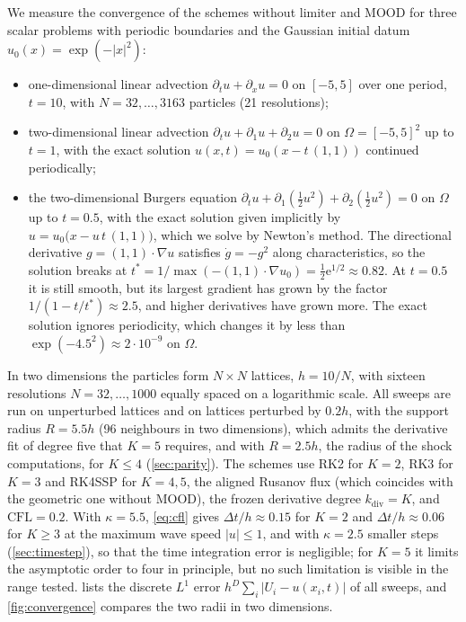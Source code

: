 \documentclass[11pt,a4paper]{article}
\numberwithin{equation}{section}
\newcommand{\CFL}{\mathrm{CFL}}
\begin{document}
We measure the convergence of the schemes without limiter and MOOD for three scalar problems with periodic boundaries and the Gaussian initial datum $u_0(x)=\exp(-|x|^2)$:
\begin{itemize}
\item one-dimensional linear advection $\partial_tu+\partial_xu=0$ on $[-5,5]$ over one period, $t=10$, with $N=32,\dots,3163$ particles (21 resolutions);
\item two-dimensional linear advection $\partial_tu+\partial_1u+\partial_2u=0$ on $\Omega=[-5,5]^2$ up to $t=1$, with the exact solution $u(x,t)=u_0(x-t\,(1,1))$ continued periodically;
\item the two-dimensional Burgers equation $\partial_tu+\partial_1(\tfrac12u^2)+\partial_2(\tfrac12u^2)=0$ on $\Omega$ up to $t=0.5$, with the exact solution given implicitly by $u=u_0\big(x-u\,t\,(1,1)\big)$, which we solve by Newton's method. The directional derivative $g=(1,1)\cdot\nabla u$ satisfies $\dot g=-g^2$ along characteristics, so the solution breaks at $t^*=1/\max(-(1,1)\cdot\nabla u_0)=\tfrac12\mathrm{e}^{1/2}\approx0.82$. At $t=0.5$ it is still smooth, but its largest gradient has grown by the factor $1/(1-t/t^*)\approx2.5$, and higher derivatives have grown more. The exact solution ignores periodicity, which changes it by less than $\exp(-4.5^2)\approx2\cdot10^{-9}$ on $\Omega$.
\end{itemize}
In two dimensions the particles form $N\times N$ lattices, $h=10/N$, with sixteen resolutions $N=32,\dots,1000$ equally spaced on a logarithmic scale. All sweeps are run on unperturbed lattices and on lattices perturbed by $0.2h$, with the support radius $R=5.5h$ (96 neighbours in two dimensions), which admits the derivative fit of degree five that $K=5$ requires, and with $R=2.5h$, the radius of the shock computations, for $K\le4$ (\cref{sec:parity}). The schemes use RK2 for $K=2$, RK3 for $K=3$ and RK4SSP for $K=4,5$, the aligned Rusanov flux (which coincides with the geometric one without MOOD), the frozen derivative degree $k_{\mathrm{div}}=K$, and $\CFL=0.2$. With $\kappa=5.5$, \eqref{eq:cfl} gives $\Delta t/h\approx0.15$ for $K=2$ and $\Delta t/h\approx0.06$ for $K\ge3$ at the maximum wave speed $|u|\le1$, and with $\kappa=2.5$ smaller steps (\cref{sec:timestep}), so that the time integration error is negligible; for $K=5$ it limits the asymptotic order to four in principle, but no such limitation is visible in the range tested.  lists the discrete $L^1$ error $h^D\sum_i|U_i-u(x_i,t)|$ of all sweeps, and \cref{fig:convergence} compares the two radii in two dimensions.
\end{document}

